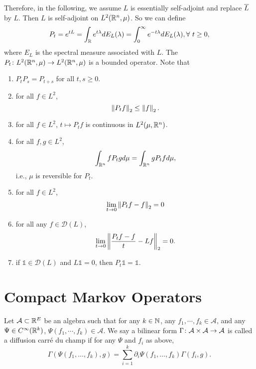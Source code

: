 Therefore, in the following, we assume $L$ is essentially self-adjoint and replace $\overline{L}$ by $L$. Then $L$ is self-adjoint on $L^2(\mathbb{R}^n,\mu)$. So we can define
\begin{equation*}
    P_t = e^{tL} = \int_{\mathbb{R}} e^{t\lambda} dE_L(\lambda) = \int_0^\infty e^{-t\lambda} dE_L(\lambda),\forall~t \geq 0,
\end{equation*}
where $E_L$ is the spectral measure associated with $L$. The $P_t \colon L^2(\mathbb{R}^n,\mu) \rightarrow L^2(\mathbb{R}^n,\mu)$ is a bounded operator. Note that
\begin{enumerate}[label=(\roman*)]
	\item $P_tP_s = P_{t+s}$ for all $t,s \geq 0$.

    \item for all $f \in L^2$,
    \begin{equation*}
        \left\lVert P_t f\right\lVert_{2} \leq \left\lVert f\right\lVert_{2}.
    \end{equation*}

    \item for all $f \in L^2$, $t \mapsto P_tf$ is continuous in $L^2(\mu,\mathbb{R}^n)$.

    \item for all $f,g \in L^2$,
    \begin{equation*}
        \int_{\mathbb{R}^n} fP_tgd\mu = \int_{\mathbb{R}^n}gP_tf d\mu,
    \end{equation*}
    i.e., $\mu$ is reversible for $P_t$.

    \item for all $f \in L^2$,
    \begin{equation*}
    	 \lim_{t \rightarrow 0} \left\lVert P_t f - f\right\lVert_{2} = 0
    \end{equation*}

    \item for all any $f \in \mathcal{D}(L)$,
    \begin{equation*}
        \lim_{t \rightarrow 0} \left\lVert\frac{P_t f - f}{t} - Lf\right\lVert_{2} = 0.
    \end{equation*}

    \item if $\mathds{1} \in \mathcal{D}(L)$ and $L\mathds{1} = 0$, then $P_t\mathds{1} = \mathds{1}$.
\end{enumerate}

\section{Compact Markov Operators}

\begin{defn}
    Let $\mathcal{A} \subset \mathbb{R}^E$ be an algebra such that for any $k \in \mathbb{N}$, any $f_1,\cdots,f_k \in \mathcal{A}$, and any $\Psi \in C^\infty(\mathbb{R}^k)$, $\Psi(f_1,\cdots,f_k) \in \mathcal{A}$. We say a bilinear form $\Gamma \colon \mathcal{A} \times \mathcal{A} \rightarrow \mathcal{A}$ is called a diffusion carr\'e du champ if for any $\Psi$ and $f_i$ as above,
    \begin{equation*}
     	\Gamma\left(\Psi\left(f_1, \ldots, f_k\right), g\right)=\sum_{i=1}^k \partial_i \Psi\left(f_1, \ldots, f_k\right) \Gamma\left(f_i, g\right) .
    \end{equation*} 
\end{defn}

